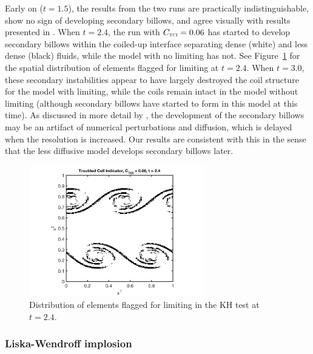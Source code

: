 \documentclass[letterpaper]{jpconf}
\newcommand{\TCI}{\textnormal{\tiny\textsc{TCI}}}
\begin{document}
Early on ($t=1.5$), the results from the two runs are practically indistinguishable, show no sign of developing secondary billows, and agree visually with results presented in \cite{mcnally_etal_2012}.  
When $t=2.4$, the run with $C_{\TCI}=0.06$ has started to develop secondary billows within the coiled-up interface separating dense (white) and less dense (black) fluids, while the model with no limiting has not.  
See Figure~\ref{fig:KelvinHelmholtz_TCI} for the spatial distribution of elements flagged for limiting at $t=2.4$.  
When $t=3.0$, these secondary instabilities appear to have largely destroyed the coil structure for the model with limiting, while the coils remain intact in the model without limiting (although secondary billows have started to form in this model at this time).  
As discussed in more detail by \cite{mcnally_etal_2012}, the development of the secondary billows may be an artifact of numerical perturbations and diffusion, which is delayed when the resolution is increased.  
Our results are consistent with this in the sense that the less diffusive model develops secondary billows later.  

\begin{figure}
  \centering
  \includegraphics[width=18pc]{./Figures/KelvinHelmholtz_TCI_24_Astronum_2018}
  \caption{\label{fig:KelvinHelmholtz_TCI}Distribution of elements flagged for limiting in the KH test at $t=2.4$.}
\end{figure}

\subsubsection{Liska-Wendroff implosion}
\end{document}
